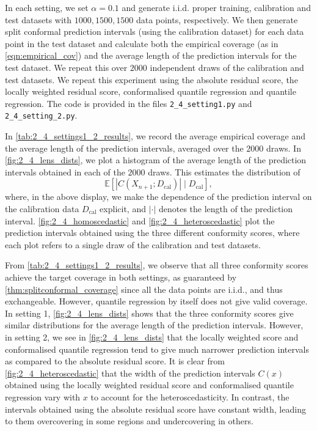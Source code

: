 \documentclass[11pt, titlepage]{article} %
\newcommand{\R}{\mathrm}
\newcommand{\Exp}[3]{\mathbb{E}\left#2 #1 \right#3}
\numberwithin{equation}{section}
\theoremstyle{definition}
\numberwithin{theorem}{section}
\numberwithin{lemma}{section}
\numberwithin{corollary}{section}
\numberwithin{proposition}{section}
\numberwithin{definition}{section}
\numberwithin{remark}{section}
\begin{document}
\noindent
In each setting, we set \(\alpha = 0.1\) and generate i.i.d. proper training, calibration and test datasets with \(1000, 1500, 1500\) data points, respectively. We then generate split conformal prediction intervals (using the calibration dataset) for each data point in the test dataset and calculate both the empirical coverage (as in \eqref{eqn:empirical_cov}) and the average length of the prediction intervals for the test dataset. We repeat this over \(2000\) independent draws of the calibration and test datasets. We repeat this experiment using the absolute residual score, the locally weighted residual score, conformalised quantile regression and quantile regression. The code is provided in the files \verb|2_4_setting1.py| and \verb|2_4_setting_2.py|. \vskip5pt

\noindent
In \cref{tab:2_4_settings1_2_results}, we record the average empirical coverage and the average length of the prediction intervals, averaged over the \(2000\) draws. 
In \cref{fig:2_4_lens_dists}, we plot a histogram of the average length of the prediction intervals obtained in each of the \(2000\) draws. This estimates the distribution of \[\Exp{|C(X_{n+1}; D_\R{cal})| \mid D_\R{cal}}{[}{]},\] where, in the above display, we make the dependence of the prediction interval on the calibration data \(D_\R{cal}\) explicit, and \(|\cdot|\) denotes the length of the prediction interval. \cref{fig:2_4_homoscedastic} and \cref{fig:2_4_heteroscedastic} plot the prediction intervals obtained using the three different conformity scores, where each plot refers to a single draw of the calibration and test datasets. \vskip5pt

\noindent
From \cref{tab:2_4_settings1_2_results}, we observe that all three conformity scores achieve the target coverage in both settings, as guaranteed by \cref{thm:splitconformal_coverage} since all the data points are i.i.d., and thus exchangeable. However, quantile regression by itself does not give valid coverage. In setting 1, \cref{fig:2_4_lens_dists} shows that the three conformity scores give similar distributions for the average length of the prediction intervals. However, in setting 2, we see in \cref{fig:2_4_lens_dists} that the locally weighted score and conformalised quantile regression tend to give much narrower prediction intervals as compared to the absolute residual score. It is clear from \cref{fig:2_4_heteroscedastic} that the width of the prediction intervals \(C(x)\) obtained using the locally weighted residual score and conformalised quantile regression vary with \(x\) to account for the heteroscedasticity. In contrast, the intervals obtained using the absolute residual score have constant width, leading to them overcovering in some regions and undercovering in others.
\end{document}
